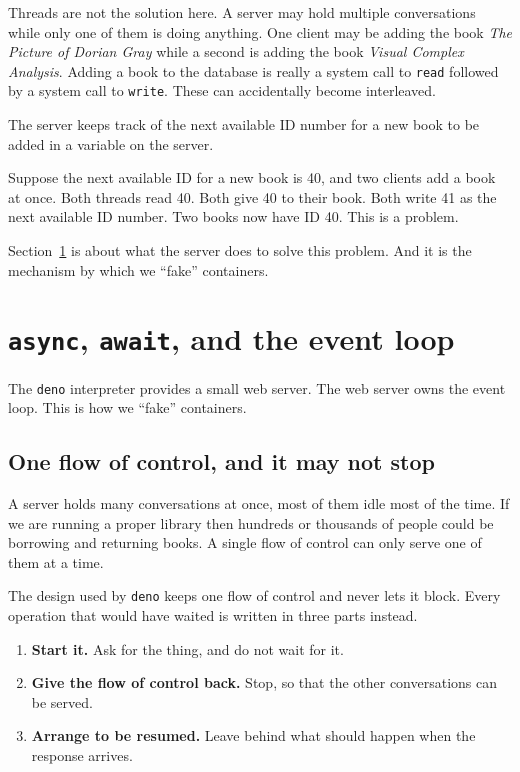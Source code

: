 \documentclass[11pt,a4paper]{article}
\begin{document}
Threads are not the solution here. A server may hold multiple conversations while only one of
them is doing anything. One client may be adding the book \emph{The Picture of Dorian Gray} while
a second is adding the book \emph{Visual Complex Analysis}. Adding a book to the database is
really a system call to \texttt{read} followed by a system call to \texttt{write}. These can
accidentally become interleaved.

\newpage

The server keeps track of the next available ID number for a new book to be added in a variable
on the server.

Suppose the next available ID for a new book is 40, and two clients add a book at once. Both
threads read 40. Both give 40 to their book. Both write 41 as the next available ID number. Two
books now have ID 40. This is a problem.

Section~\ref{sec:async} is about what the server does to solve this problem. And it is the
mechanism by which we ``fake'' containers.

\newpage

\section{\texttt{async}, \texttt{await}, and the event loop}
\label{sec:async}

\begin{sectionbox}
The \texttt{deno} interpreter provides a small web server. The web server owns the event loop.
This is how we ``fake'' containers.
\end{sectionbox}

\subsection{One flow of control, and it may not stop}
\label{sec:oneflow}

A server holds many conversations at once, most of them idle most of the time. If we are running a
proper library then hundreds or thousands of people could be borrowing and returning books. A
single flow of control can only serve one of them at a time.

The design used by \texttt{deno} keeps one flow of control and never lets it block. Every operation
that would have waited is written in three parts instead.

\begin{enumerate}\setlength{\itemsep}{2pt}
\item \textbf{Start it.} Ask for the thing, and do not wait for it.
\item \textbf{Give the flow of control back.} Stop, so that the other conversations can be served.
\item \textbf{Arrange to be resumed.} Leave behind what should happen when the response arrives.
\end{enumerate}
\end{document}
